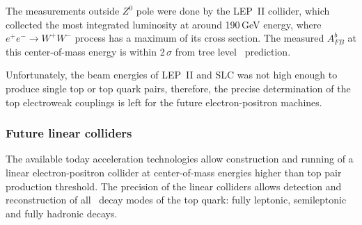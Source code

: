 The measurements outside $Z^0$ pole were done by the LEP~II collider, which collected the most integrated luminosity at around 190\,GeV energy, where $e^+e^- \to W^+W^-$ process has a maximum of its cross section.
The measured $A_{FB}^b$ at this center-of-mass energy is within 2\,$\sigma$ from tree level \sm\ prediction.

Unfortunately, the beam energies of LEP~II and SLC was not high enough to produce single top or top quark pairs, therefore, the precise determination of the top electroweak couplings is left for the future electron-positron machines.

\subsubsection{Future linear colliders}

The available today acceleration technologies allow construction and running of a linear electron-positron collider at center-of-mass energies higher than top pair production threshold. The precision of the linear colliders allows detection and reconstruction of all \sm\ decay modes of the top quark: fully leptonic, semileptonic and fully hadronic decays. 

